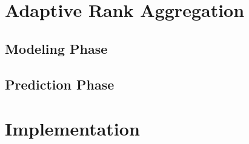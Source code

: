 \section{Adaptive Rank Aggregation}
\label{sec:methods:rank}

\subsection{Modeling Phase}

\subsection{Prediction Phase}

\section{Implementation}
\label{sec:implementation}
